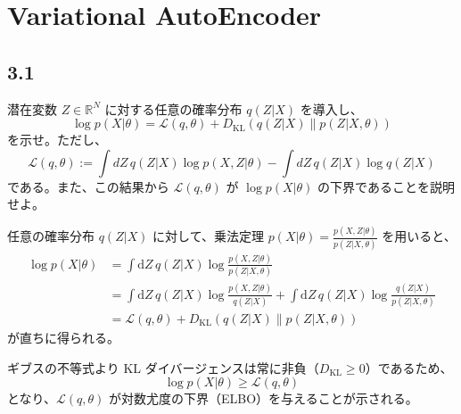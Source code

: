 \documentclass[11pt,a4paper,dvipdfmx]{article}
\numberwithin{equation}{section}
\newenvironment{proofbox}[0]
{
    \begin{mdframed}[
        linecolor=black,
        topline=false,
        bottomline=false,
        rightline=false,
        leftline=true,
        linewidth=2pt,
        innerleftmargin=10pt,
        skipabove=\baselineskip,
        skipbelow=\baselineskip,
    ]
}
{
    \end{mdframed}
}
\newenvironment{note}[0]
{
    \begin{tcolorbox}[sharp corners, colframe=gray!20, colback=gray!20, width=\textwidth]
}
{
    \end{tcolorbox}
}
\begin{document}
\section{Variational AutoEncoder}

\subsection*{3.1}
\begin{note}
潜在変数 $Z \in \mathbb{R}^N$ に対する任意の確率分布 $q(Z|X)$ を導入し、
\[ \log p(X|\theta) = \mathcal{L}(q, \theta) + D_{\mathrm{KL}}(q(Z|X) \parallel p(Z|X, \theta)) \]
を示せ。ただし、
\[ \mathcal{L}(q, \theta) := \int dZ \, q(Z|X) \log p(X, Z|\theta) - \int dZ \, q(Z|X) \log q(Z|X) \]
である。また、この結果から $\mathcal{L}(q, \theta)$ が $\log p(X|\theta)$ の下界であることを説明せよ。
\end{note}
\begin{proofbox}
任意の確率分布 $q(Z|X)$ に対して、乗法定理 $p(X|\theta) = \frac{p(X, Z|\theta)}{p(Z|X, \theta)}$ を用いると、
\[
\begin{aligned}
\log p(X|\theta) &= \int \mathrm{d}Z \, q(Z|X) \log \frac{p(X, Z|\theta)}{p(Z|X, \theta)} \\
&= \int \mathrm{d}Z \, q(Z|X) \log \frac{p(X, Z|\theta)}{q(Z|X)} + \int \mathrm{d}Z \, q(Z|X) \log \frac{q(Z|X)}{p(Z|X, \theta)} \\
&= \mathcal{L}(q, \theta) + D_{\mathrm{KL}}(q(Z|X) \parallel p(Z|X, \theta))
\end{aligned}
\]
が直ちに得られる。

ギブスの不等式より KL ダイバージェンスは常に非負（$D_{\mathrm{KL}} \geq 0$）であるため、
\[
\log p(X|\theta) \geq \mathcal{L}(q, \theta)
\]
となり、$\mathcal{L}(q, \theta)$ が対数尤度の下界（ELBO）を与えることが示される。
\end{proofbox}
\end{document}
